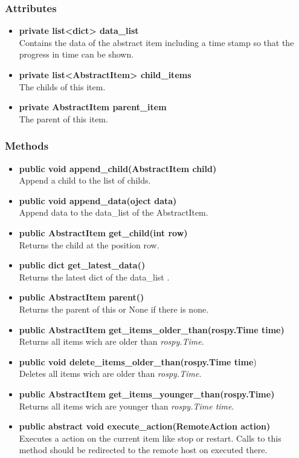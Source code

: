 \subsubsection{Attributes}
\begin{itemize}
  \item \textbf{private list<dict> data\_list}\\ 
  Contains the data of the abstract item including a time stamp so that
  the progress in time can be shown.
  \item \textbf{private list<AbstractItem> child\_items}\\ 
  The childs of this item.
  \item \textbf{private AbstractItem parent\_item}\\ 
  The parent of this item.
\end{itemize}
\subsubsection{Methods}
\begin{itemize}
   \item \textbf{public void append\_child(AbstractItem child)}\\ 
   Append a child to the list of childs.
  \item \textbf{public void append\_data(oject data)}\\ 
  Append data to the data\_list of the AbstractItem.
  \item \textbf{public AbstractItem get\_child(int row)}\\ 
  Returns the child at the position row.
  \item \textbf{public dict get\_latest\_data()}\\ 
  Returns the latest dict of the data\_list .
  \item \textbf{public AbstractItem parent()}\\ 
  Returns the parent of this or None if there is none.
  \item \textbf{public AbstractItem get\_items\_older\_than(rospy.Time time)}\\
  Returns all items wich are older than \textit{rospy.Time}.
  \item \textbf{public void delete\_items\_older\_than(rospy.Time time})\\
  Deletes all items wich are older than \textit{rospy.Time}.
  \item \textbf{public AbstractItem get\_items\_younger\_than(rospy.Time)}\\
  Returns all items wich are younger than \textit{rospy.Time time}.
  \item \textbf{public abstract void execute\_action(RemoteAction action)}\\ 
  Executes a action on the current item like stop or restart. Calls to this
  method should be redirected to the remote host on executed there.
\end{itemize}

